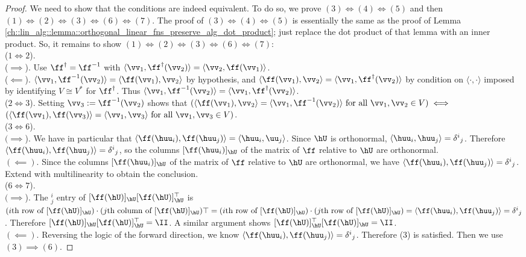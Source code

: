\begin{proof}
    We need to show that the conditions are indeed equivalent. To do so, we prove $(3) \iff (4) \iff (5)$ and then $(1) \iff (2) \iff (3) \iff (6) \iff (7)$. The proof of $(3) \iff (4) \iff (5)$ is essentially the same as the proof of Lemma \ref{ch::lin_alg::lemma::orthogonal_linear_fns_preserve_alg_dot_product}; just replace the dot product of that lemma with an inner product. So, it remains to show $(1) \iff (2) \iff (3) \iff (6) \iff (7)$:
    \mbox{} \\
        ($1 \iff 2$).
        \\ \indent ($\implies$). Use $\ff^\dag = \ff^{-1}$ with $\langle \vv_1, \ff^\dag(\vv_2) \rangle = \langle \vv_2, \ff(\vv_1) \rangle$.
        \\ \indent($\impliedby$). $\langle \vv_1, \ff^{-1}(\vv_2) \rangle = \langle \ff(\vv_1), \vv_2 \rangle$ by hypothesis, and $\langle \ff(\vv_1), \vv_2 \rangle = \langle \vv_1, \ff^\dag(\vv_2) \rangle$ by condition on $\langle \cdot, \cdot \rangle$ imposed by identifying $V \cong V^*$ for $\ff^\dag$. Thus $\langle \vv_1, \ff^{-1}(\vv_2) \rangle = \langle \vv_1, \ff^\dag(\vv_2) \rangle$.
        \\ ($2 \iff 3$). Setting $\vv_3 := \ff^{-1}(\vv_2)$ shows that ${(\langle \ff(\vv_1), \vv_2 \rangle = \langle \vv_1, \ff^{-1}(\vv_2) \rangle \text{ for all $\vv_1, \vv_2 \in V$})} \iff$ \\ ${(\langle \ff(\vv_1), \ff(\vv_3) \rangle = \langle \vv_1, \vv_3 \rangle \text{ for all $\vv_1, \vv_3 \in V$})}$.
        \\ ($3 \iff 6$). 
        \\ \indent $(\implies$). We have in particular that $\langle \ff(\huu_i), \ff(\huu_j) \rangle = \langle \huu_i, {\uu}_j \rangle$. Since $\hU$ is orthonormal, $\langle \huu_i, \huu_j \rangle = \delta^i{}_j$. Therefore $\langle \ff(\huu_i), \ff(\huu_j) \rangle = \delta^i{}_j$, so the columns $[\ff(\huu_i)]_{\hU}$ of the matrix of $\ff$ relative to $\hU$ are orthonormal.
        \\ \indent $(\impliedby)$. Since the columns $[\ff(\huu_i)]_{\hU}$ of the matrix of $\ff$ relative to $\hU$ are orthonormal, we have $\langle \ff(\huu_i), \ff(\huu_j) \rangle = \delta^i{}_j$. Extend with multilinearity to obtain the conclusion.
        \\ ($6 \iff 7$).
        \\ \indent $(\implies$). The $^i_j$ entry of $[\ff(\hU)]_{\hU} [\ff(\hU)]_{\hU}^\top$ is $(\text{$i$th row of $[\ff(\hU)]_{\hU}$}) \cdot (\text{$j$th column of $[\ff(\hU)]_{\hU}$})\top = (\text{$i$th row of $[\ff(\hU)]_{\hU}$}) \cdot (\text{$j$th row of $[\ff(\hU)]_{\hU}$}) = \langle \ff(\huu_i), \ff(\huu_j) \rangle = \delta^i{}_j$. Therefore $[\ff(\hU)]_{\hU} [\ff(\hU)]_{\hU}^\top = \II$. A similar argument shows $[\ff(\hU)]_{\hU}^\top [\ff(\hU)]_{\hU} = \II$.
        \\ \indent $(\impliedby)$. Reversing the logic of the forward direction, we know $\langle \ff(\huu_i), \ff(\huu_j) \rangle = \delta^i{}_j$. Therefore (3) is satisfied. Then we use $(3) \implies (6)$.
\end{proof}

